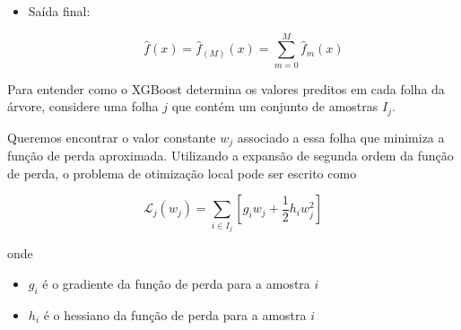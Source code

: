 \documentclass{article}
\begin{document}
\begin{itemize}
\begin{enumerate}
\begin{enumerate}
Esse problema corresponde a ajustar uma função $\phi(x)$ que aproxime
o passo de atualização obtido pela expansão de segunda ordem da
função de perda.

\item Definir a contribuição da nova árvore:

\begin{equation}
\hat{f}_m(x) = \alpha \hat{\phi}_m(x)
\end{equation}

onde $\alpha$ é a taxa de aprendizado que controla o tamanho do passo
de atualização.

\end{enumerate}

\item Atualizar o modelo:

\begin{equation}
\hat{f}_{(m)}(x) =
\hat{f}_{(m-1)}(x) + \hat{f}_m(x)
\end{equation}

\end{enumerate}

\item Saída final:

\begin{equation}
\hat{f}(x) =
\hat{f}_{(M)}(x) =
\sum_{m=0}^{M} \hat{f}_m(x)
\end{equation}

\end{itemize}

Para entender como o XGBoost determina os valores preditos em cada folha
da árvore, considere uma folha $j$ que contém um conjunto de amostras
$I_j$.

Queremos encontrar o valor constante $w_j$ associado a essa folha que
minimiza a função de perda aproximada. Utilizando a expansão de segunda
ordem da função de perda, o problema de otimização local pode ser escrito
como

\begin{equation}
\mathcal{L}_j(w_j) =
\sum_{i \in I_j}
\left[
g_i w_j + \frac{1}{2} h_i w_j^2
\right]
\end{equation}

onde

\begin{itemize}
\item $g_i$ é o gradiente da função de perda para a amostra $i$
\item $h_i$ é o hessiano da função de perda para a amostra $i$
\end{itemize}
\end{document}
